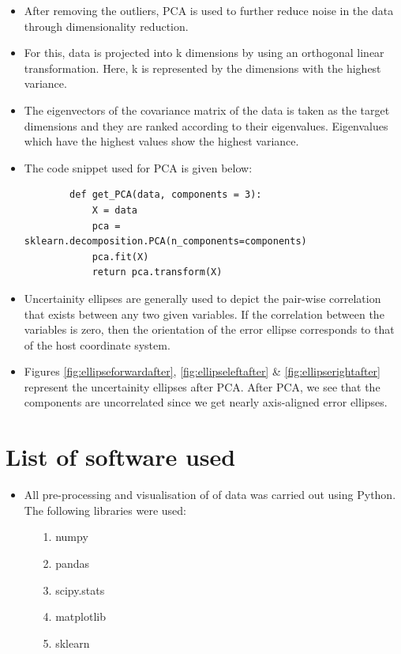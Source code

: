     \begin{itemize}
        \item After removing the outliers, PCA is used to further reduce noise in the data through dimensionality reduction. 
        \item For this, data is projected into k dimensions by using an orthogonal linear transformation. Here, k is represented by the dimensions with the highest variance.
        \item The eigenvectors of the covariance matrix of the data is taken as the target dimensions and they are ranked according to their eigenvalues. Eigenvalues which have the highest values show the highest variance.  
        \item The code snippet used for PCA is given below:
        
           \begin{verbatim} 
        def get_PCA(data, components = 3):
            X = data
            pca = sklearn.decomposition.PCA(n_components=components)
            pca.fit(X)
            return pca.transform(X)
           \end{verbatim}
        
        \item Uncertainity ellipses are generally used to depict the pair-wise correlation that exists between any two given  variables. If the correlation between the variables is zero, then the orientation of the error ellipse corresponds to that of the host coordinate system. 
        \item Figures \ref{fig:ellipseforwardafter}, \ref{fig:ellipseleftafter} \& \ref{fig:ellipserightafter} represent the uncertainity ellipses after PCA. After PCA, we see that the components are uncorrelated since we get nearly axis-aligned error ellipses.
    \end{itemize}
    
    
    \section{List of software used}
    \begin{itemize}
        \item All pre-processing and visualisation of of data was carried out using Python. The following libraries were used:
        \begin{itemize}
            \item[1.] numpy
            \item[2.] pandas
            \item[3.] scipy.stats
            \item[4.] matplotlib
            \item[5.] sklearn
        \end{itemize}
    \end{itemize}
    
